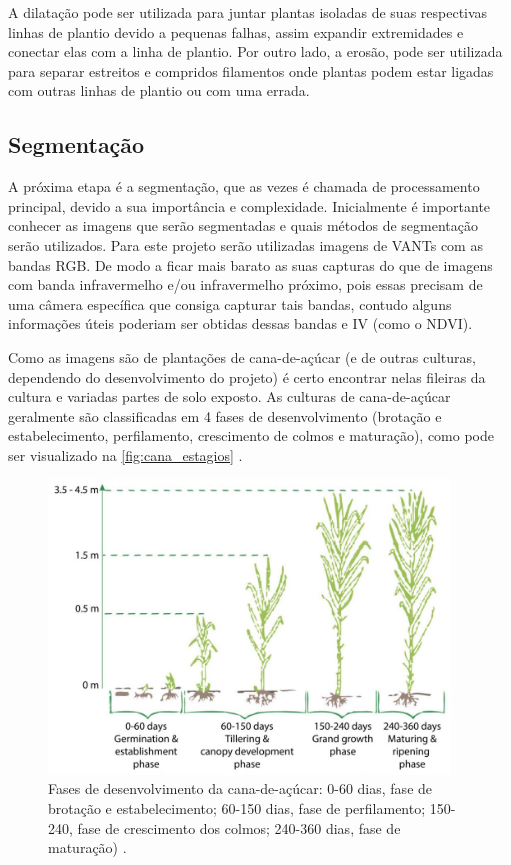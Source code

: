 \documentclass[12pt, a4paper, english, brazil]{article}
\begin{document}
A dilatação pode ser utilizada para juntar plantas isoladas de suas respectivas linhas de plantio devido a pequenas falhas, assim expandir extremidades e conectar elas com a linha de plantio. Por outro lado, a erosão, pode ser utilizada para separar estreitos e compridos filamentos onde plantas podem estar ligadas com outras linhas de plantio ou com uma errada.

\subsection{Segmentação}

A próxima etapa é a segmentação, que as vezes é chamada de processamento principal, devido a sua importância e complexidade. Inicialmente é importante conhecer as imagens que serão segmentadas e quais métodos de segmentação serão utilizados. Para este projeto serão utilizadas imagens de VANTs com as bandas RGB. De modo a ficar mais barato as suas capturas do que de imagens com banda infravermelho e/ou infravermelho próximo, pois essas precisam de uma câmera específica que consiga capturar tais bandas, contudo alguns informações úteis poderiam ser obtidas dessas bandas e IV (como o NDVI).

Como as imagens são de plantações de cana-de-açúcar (e de outras culturas, dependendo do desenvolvimento do projeto) é certo encontrar nelas fileiras da cultura e variadas partes de solo exposto. As culturas de cana-de-açúcar geralmente são classificadas em 4 fases de desenvolvimento (brotação e estabelecimento, perfilamento, crescimento de colmos e maturação), como pode ser visualizado na \autoref{fig:cana_estagios} \cite{Lu_Zhou_2019}.

\begin{figure}[htbp]
    \centering
    \includegraphics[width=0.95\textwidth]{img/cana_estagios.jpg}
    \caption{Fases de desenvolvimento da cana-de-açúcar: 0-60 dias, fase de brotação e estabelecimento; 60-150 dias, fase de perfilamento; 150-240, fase de crescimento dos colmos; 240-360 dias, fase de maturação) \cite{Molijn_2019}.}
    \label{fig:cana_estagios}
\end{figure}
\end{document}
